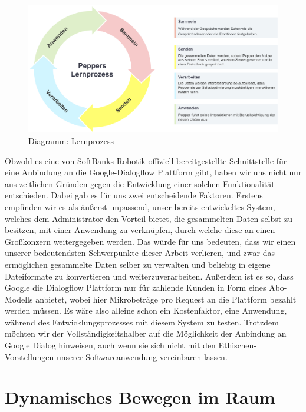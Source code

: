 \begin{figure}[H]
    \includegraphics[width=\textwidth]{Figures/pepper-lerprozess.png}
    \caption{Diagramm: Lernprozess}
    \label{fig:integration}
    \centering
\end{figure}

Obwohl es eine von SoftBanks-Robotik offiziell bereitgestellte Schnittstelle für eine Anbindung an die Google-Dialogflow Plattform gibt, haben wir uns nicht nur aus zeitlichen Gründen gegen die Entwicklung einer solchen Funktionalität entschieden. Dabei gab es für uns zwei entscheidende Faktoren. Erstens empfinden wir es als äußerst unpassend, unser bereits entwickeltes System, welches dem Administrator den Vorteil bietet, die gesammelten Daten selbst zu besitzen, mit einer Anwendung zu verknüpfen, durch welche diese an einen Großkonzern weitergegeben werden. Das würde für uns bedeuten, dass wir einen unserer bedeutendsten Schwerpunkte dieser Arbeit verlieren, und zwar das ermöglichen gesammelte Daten selber zu verwalten und beliebig in eigene Dateiformate zu konvertieren und weiterzuverarbeiten. Außerdem ist es so, dass Google die Dialogflow Plattform nur für zahlende Kunden in Form eines Abo-Modells anbietet, wobei hier Mikrobeträge pro Request an die Plattform bezahlt werden müssen. Es wäre also alleine schon ein Kostenfaktor, eine Anwendung, während des Entwicklungsprozesses mit diesem System zu testen. Trotzdem möchten wir der Vollständigkeitshalber auf die Möglichkeit der Anbindung an Google Dialog hinweisen, auch wenn sie sich nicht mit den Ethischen-Vorstellungen unserer Softwareanwendung vereinbaren lassen.\\

\section{Dynamisches Bewegen im Raum}

